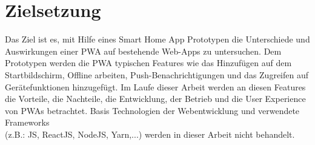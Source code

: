 \newpage
\section{Zielsetzung}\label{sub:Zielsetzung}
Das Ziel  ist es, mit Hilfe eines Smart Home App Prototypen die Unterschiede und Auswirkungen einer \acs{PWA} auf bestehende \acs{Web-App}s zu untersuchen.  
Dem Prototypen werden die \acs{PWA} typischen Features wie das Hinzufügen auf dem Startbildschirm, Offline arbeiten, Push-Benachrichtigungen und 
das Zugreifen auf Gerätefunktionen hinzugefügt. 
Im Laufe dieser Arbeit werden an diesen Features die Vorteile, die Nachteile, die Entwicklung, der Betrieb und die User Experience von \acl{PWA}s betrachtet.
Basis Technologien der Webentwicklung und verwendete Frameworks  \\(z.B.: \acl{JS}, ReactJS, NodeJS, Yarn,...) werden in dieser Arbeit nicht behandelt.
